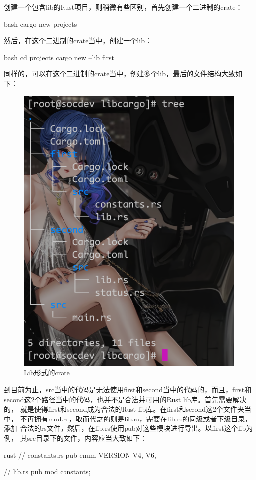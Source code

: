 创建一个包含lib的Rust项目，则稍微有些区别，首先创建一个二进制的crate：
\begin{code-block}{bash}
cargo new projects
\end{code-block}
然后，在这个二进制的crate当中，创建一个lib：
\begin{code-block}{bash}
cd projects
cargo new --lib first
\end{code-block}
同样的，可以在这个二进制的crate当中，创建多个lib，最后的文件结构大致如下：
\begin{figure}[H]
  \centering
  \includegraphics[scale=0.6]{rust_lib.png}
  \caption{Lib形式的crate}
  \label{fig:rust_lib}
\end{figure}

到目前为止，src当中的代码是无法使用first和second当中的代码的，而且，first和
second这2个路径当中的代码，也并不是合法并可用的Rust lib库。首先需要解决的，
就是使得first和second成为合法的Rust lib库。在first和second这2个文件夹当中，
不再拥有mod.rs，取而代之的则是lib.rs，需要在lib.rs的同级或者下级目录，添加
合法的rs文件，然后，在lib.rs使用pub对这些模块进行导出。以first这个lib为例，
其src目录下的文件，内容应当大致如下：
\begin{code-block}{rust}
// constants.rs
pub enum VERSION {
    V4,
    V6,
}

// lib.rs
pub mod constants;
\end{code-block}

